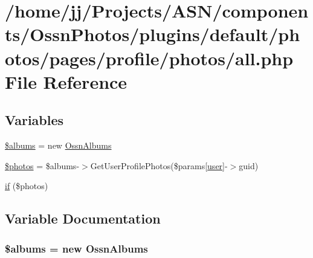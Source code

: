 \hypertarget{_ossn_photos_2plugins_2default_2photos_2pages_2profile_2photos_2all_8php}{}\section{/home/jj/\+Projects/\+A\+S\+N/components/\+Ossn\+Photos/plugins/default/photos/pages/profile/photos/all.php File Reference}
\label{_ossn_photos_2plugins_2default_2photos_2pages_2profile_2photos_2all_8php}
\subsection*{Variables}
\begin{DoxyCompactItemize}
\item 
\hyperlink{_ossn_photos_2plugins_2default_2photos_2pages_2profile_2photos_2all_8php_a23e8244caaacd14d608137a383e8f0e7}{\$albums} = new \hyperlink{class_ossn_albums}{Ossn\+Albums}
\item 
\hyperlink{_ossn_photos_2plugins_2default_2photos_2pages_2profile_2photos_2all_8php_a7d16539c7a3688bee1d3184c81c47487}{\$photos} = \$albums-\/$>$Get\+User\+Profile\+Photos(\$params\mbox{[}\textquotesingle{}\hyperlink{ossn_8config_8db_8example_8php_a802544b7ba9f79bbf24ef67773d53bed}{user}\textquotesingle{}\mbox{]}-\/$>$guid)
\item 
\hyperlink{_ossn_photos_2plugins_2default_2photos_2pages_2profile_2photos_2all_8php_a866f96068cd497b122fcd4efd2ebfff4}{if} (\$photos)
\end{DoxyCompactItemize}


\subsection{Variable Documentation}
\subsubsection[{\texorpdfstring{\$albums}{$albums}}]{\setlength{\rightskip}{0pt plus 5cm}\$albums = new {\bf Ossn\+Albums}}\hypertarget{_ossn_photos_2plugins_2default_2photos_2pages_2profile_2photos_2all_8php_a23e8244caaacd14d608137a383e8f0e7}{}\label{_ossn_photos_2plugins_2default_2photos_2pages_2profile_2photos_2all_8php_a23e8244caaacd14d608137a383e8f0e7}


